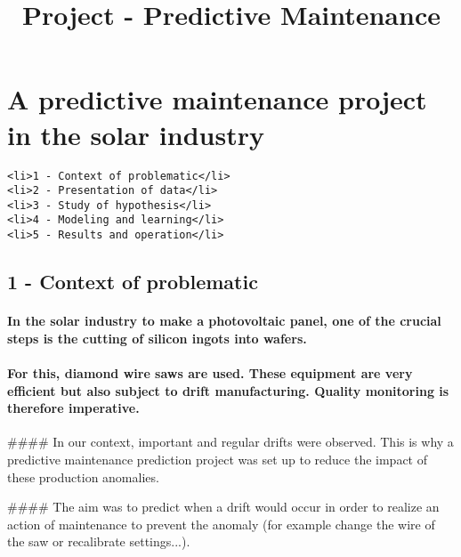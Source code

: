 \documentclass[11pt]{article}
\title{Project - Predictive Maintenance}
\begin{document}
    
    
    \maketitle
    
    

    
    \section{A predictive maintenance project in the solar
industry}\label{a-predictive-maintenance-project-in-the-solar-industry}

    \begin{verbatim}
<li>1 - Context of problematic</li>
<li>2 - Presentation of data</li>
<li>3 - Study of hypothesis</li>
<li>4 - Modeling and learning</li>
<li>5 - Results and operation</li>
\end{verbatim}

    

    \subsection{1 - Context of problematic}\label{context-of-problematic}

    \paragraph{In the solar industry to make a photovoltaic panel, one of
the crucial steps is the cutting of silicon ingots into
wafers.}\label{in-the-solar-industry-to-make-a-photovoltaic-panel-one-of-the-crucial-steps-is-the-cutting-of-silicon-ingots-into-wafers.}

    

    \paragraph{For this, diamond wire saws are used. These equipment are
very efficient but also subject to drift manufacturing. Quality
monitoring is therefore
imperative.}\label{for-this-diamond-wire-saws-are-used.-these-equipment-are-very-efficient-but-also-subject-to-drift-manufacturing.-quality-monitoring-is-therefore-imperative.}

 \#\#\#\# In our context, important and regular drifts were observed.
This is why a predictive maintenance prediction project was set up to
reduce the impact of these production anomalies.

     \#\#\#\# The aim was to predict when a drift would occur in order to
realize an action of maintenance to prevent the anomaly (for example
change the wire of the saw or recalibrate settings...).
\end{document}
